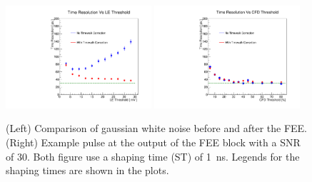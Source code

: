 \documentclass[preprint,1p]{elsarticle}
\begin{document}
  \begin{figure}[htbp]
    \centering
    \includegraphics[width=0.48\textwidth]{figs/ShapingTime1p0_SNR30_55MicronGain15Prerad_FIXED_NOISE_FIXED_SNR_V2_converted_TimeResolutionVsThresholdToT.pdf} \hfill
    \includegraphics[width=0.48\textwidth]{figs/ShapingTime1p0_SNR30_55MicronGain15Prerad_FIXED_NOISE_FIXED_SNR_V2_converted_TimeResolutionVsThresholdCFD.pdf}
    \caption{(Left) Comparison of gaussian white noise before and after the FEE.
    (Right) Example pulse at the output of the FEE block with a SNR of 30. Both figure use a shaping time (ST) of 1~\si{ns}. Legends for the shaping times are shown in the plots.}
    \label{fig:time_resolution_scan}
  \end{figure}
\end{document}
